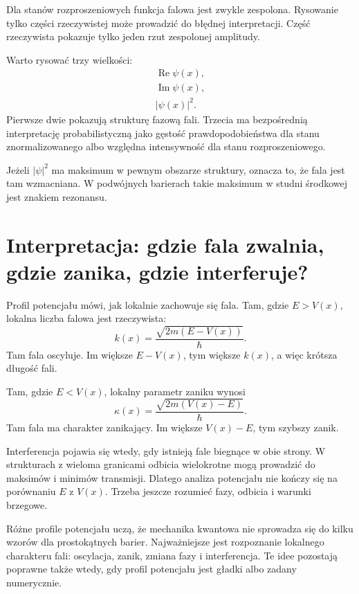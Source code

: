 Dla stanów rozproszeniowych funkcja falowa jest zwykle zespolona. Rysowanie tylko części rzeczywistej może prowadzić do błędnej interpretacji. Część rzeczywista pokazuje tylko jeden rzut zespolonej amplitudy.

Warto rysować trzy wielkości:
\begin{align}
    \operatorname{Re}\psi(x),\\
    \operatorname{Im}\psi(x),\\
    |\psi(x)|^2.
\end{align}
Pierwsze dwie pokazują strukturę fazową fali. Trzecia ma bezpośrednią interpretację probabilistyczną jako gęstość prawdopodobieństwa dla stanu znormalizowanego albo względna intensywność dla stanu rozproszeniowego.

Jeżeli \(|\psi|^2\) ma maksimum w pewnym obszarze struktury, oznacza to, że fala jest tam wzmacniana. W podwójnych barierach takie maksimum w studni środkowej jest znakiem rezonansu.

\section{Interpretacja: gdzie fala zwalnia, gdzie zanika, gdzie interferuje?}

Profil potencjału mówi, jak lokalnie zachowuje się fala. Tam, gdzie \(E>V(x)\), lokalna liczba falowa jest rzeczywista:
\begin{equation}
    k(x)=\frac{\sqrt{2m(E-V(x))}}{\hbar}.
\end{equation}
Tam fala oscyluje. Im większe \(E-V(x)\), tym większe \(k(x)\), a więc krótsza długość fali.

Tam, gdzie \(E<V(x)\), lokalny parametr zaniku wynosi
\begin{equation}
    \kappa(x)=\frac{\sqrt{2m(V(x)-E)}}{\hbar}.
\end{equation}
Tam fala ma charakter zanikający. Im większe \(V(x)-E\), tym szybszy zanik.

Interferencja pojawia się wtedy, gdy istnieją fale biegnące w obie strony. W strukturach z wieloma granicami odbicia wielokrotne mogą prowadzić do maksimów i minimów transmisji. Dlatego analiza potencjału nie kończy się na porównaniu \(E\) z \(V(x)\). Trzeba jeszcze rozumieć fazy, odbicia i warunki brzegowe.

\begin{summarybox}
Różne profile potencjału uczą, że mechanika kwantowa nie sprowadza się do kilku wzorów dla prostokątnych barier. Najważniejsze jest rozpoznanie lokalnego charakteru fali: oscylacja, zanik, zmiana fazy i interferencja. Te idee pozostają poprawne także wtedy, gdy profil potencjału jest gładki albo zadany numerycznie.
\end{summarybox}

